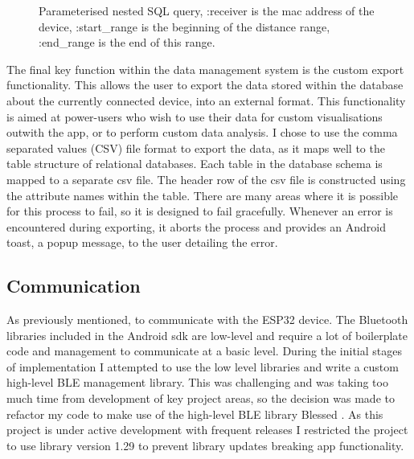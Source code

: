 \documentclass{l4proj}
\begin{document}
\begin{figure}[!htb]
    
    \caption{ Parameterised nested SQL query, :receiver is the mac address of the device, :start\_range is the beginning of the distance range, :end\_range is the end of this range. }
    \label{cde:sql}
\end{figure}

The final key function within the data management system is the custom export functionality. This allows the user to export the data stored within the database about the currently connected device, into an external format. This functionality is aimed at power-users who wish to use their data for custom visualisations outwith the app, or to perform custom data analysis. I chose to use the comma separated values (CSV) file format to export the data, as it maps well to the table structure of relational databases. Each table in the database schema is mapped to a separate csv file. The header row of the csv file is constructed using the attribute names within the table. There are many areas where it is possible for this process to fail, so it is designed to fail gracefully. Whenever an error is encountered during exporting, it aborts the process and provides an Android toast, a popup message, to the user detailing the error.

\subsection{Communication}

As previously mentioned, to communicate with the ESP32 device. The Bluetooth libraries included in the Android sdk are low-level and require a lot of boilerplate code and management to communicate at a basic level. During the initial stages of implementation I attempted to use the low level libraries and write a custom high-level BLE management library. This was challenging and was taking too much time from development of key project areas, so the decision was made to refactor my code to make use of the high-level BLE library Blessed \citep{welie_weliemblessed-android_2021}. As this project is under active development with frequent releases I restricted the project to use library version 1.29 to prevent library updates breaking app functionality.
\end{document}
